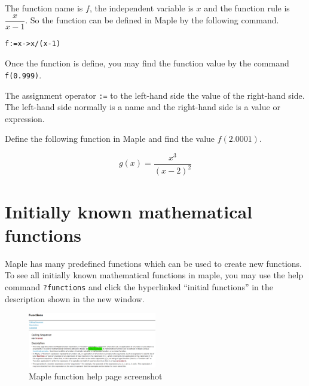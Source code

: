 \documentclass[
  en,11pt,simple]{elegantbook}
\newcommand{\size}[2]{{\fontsize{#1}{0}\selectfont#2}}
\renewenvironment{exercise}[1][]{
    \refstepcounter{exer}
    \par\noindent
    \makebox[-3pt][r]{\color{red!90}\size{12}{\HandPencilLeft}}
	\textbf{\color{main}{\exercisename} \theexer #1}
    \rmfamily
}{\par\ignorespacesafterend}
\begin{document}
\begin{solution}
{}The function name is \(f\), the independent variable is \(x\) and the function rule is \(\dfrac{x}{x-1}\). So the function can be defined in Maple by the following command.

\begin{verbatim}
f:=x->x/(x-1)
\end{verbatim}

Once the function is define, you may find the function value by the command \texttt{f(0.999)}.
\end{solution}

\begin{remark}
{}
The assignment operator \texttt{:=} to the left-hand side the value of the right-hand side. The left-hand side normally is a name and the right-hand side is a value or expression.
\end{remark}

\begin{exercise}

Define the following function in Maple and find the value \(f(2.0001)\).

\[
g(x)=\dfrac{x^3}{(x-2)^2}
\]
\end{exercise}

\hypertarget{initially-known-mathematical-functions}{%
\section{Initially known mathematical functions}\label{initially-known-mathematical-functions}}

Maple has many predefined functions which can be used to create new functions. To see all initially known mathematical functions in maple, you may use the help command \texttt{?functions} and click the hyperlinked ``initial functions'' in the description shown in the new window.

\begin{figure}
\centering
\includegraphics[width=0.5\textwidth,height=\textheight]{figs/Initial-Functions.PNG}
\caption{Maple function help page screenshot}
\end{figure}
\end{document}
